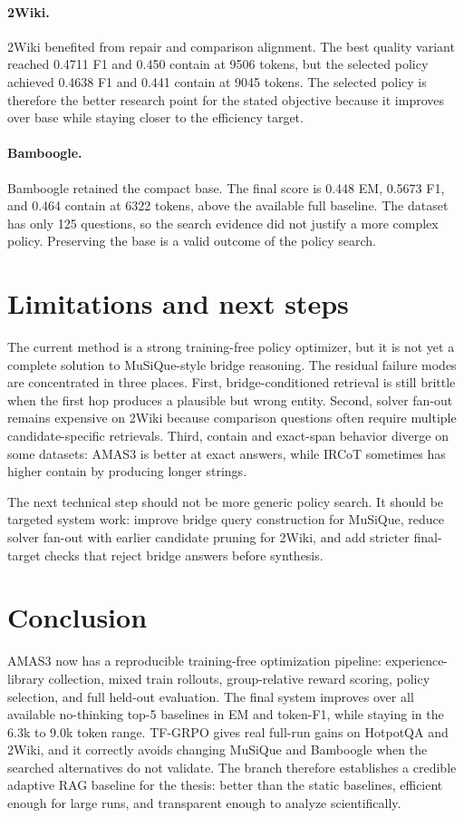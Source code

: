 \documentclass[10pt]{article}
\begin{document}
\paragraph{2Wiki.}
2Wiki benefited from repair and comparison alignment. The best quality variant reached 0.4711 F1 and 0.450 contain at 9506 tokens, but the selected policy achieved 0.4638 F1 and 0.441 contain at 9045 tokens. The selected policy is therefore the better research point for the stated objective because it improves over base while staying closer to the efficiency target.

\paragraph{Bamboogle.}
Bamboogle retained the compact base. The final score is 0.448 EM, 0.5673 F1, and 0.464 contain at 6322 tokens, above the available full baseline. The dataset has only 125 questions, so the search evidence did not justify a more complex policy. Preserving the base is a valid outcome of the policy search.

\section{Limitations and next steps}

The current method is a strong training-free policy optimizer, but it is not yet a complete solution to MuSiQue-style bridge reasoning. The residual failure modes are concentrated in three places. First, bridge-conditioned retrieval is still brittle when the first hop produces a plausible but wrong entity. Second, solver fan-out remains expensive on 2Wiki because comparison questions often require multiple candidate-specific retrievals. Third, contain and exact-span behavior diverge on some datasets: AMAS3 is better at exact answers, while IRCoT sometimes has higher contain by producing longer strings.

The next technical step should not be more generic policy search. It should be targeted system work: improve bridge query construction for MuSiQue, reduce solver fan-out with earlier candidate pruning for 2Wiki, and add stricter final-target checks that reject bridge answers before synthesis.

\section{Conclusion}

AMAS3 now has a reproducible training-free optimization pipeline: experience-library collection, mixed train rollouts, group-relative reward scoring, policy selection, and full held-out evaluation. The final system improves over all available no-thinking top-5 baselines in EM and token-F1, while staying in the 6.3k to 9.0k token range. TF-GRPO gives real full-run gains on HotpotQA and 2Wiki, and it correctly avoids changing MuSiQue and Bamboogle when the searched alternatives do not validate. The branch therefore establishes a credible adaptive RAG baseline for the thesis: better than the static baselines, efficient enough for large runs, and transparent enough to analyze scientifically.
\end{document}
